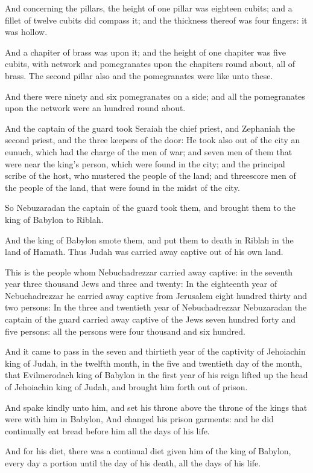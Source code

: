 \Verse And concerning the pillars, the height of one pillar was eighteen cubits; and a fillet of twelve cubits did compass it; and the thickness thereof was four fingers: it was hollow.

\Verse And a chapiter of brass was upon it; and the height of one chapiter was five cubits, with network and pomegranates upon the chapiters round about, all of brass. The second pillar also and the pomegranates were like unto these.

\Verse And there were ninety and six pomegranates on a side; and all the pomegranates upon the network were an hundred round about.

\Verse And the captain of the guard took Seraiah the chief priest, and Zephaniah the second priest, and the three keepers of the door: \Verse He took also out of the city an eunuch, which had the charge of the men of war; and seven men of them that were near the king's person, which were found in the city; and the principal scribe of the host, who mustered the people of the land; and threescore men of the people of the land, that were found in the midst of the city.

\Verse So Nebuzaradan the captain of the guard took them, and brought them to the king of Babylon to Riblah.

\Verse And the king of Babylon smote them, and put them to death in Riblah in the land of Hamath. Thus Judah was carried away captive out of his own land.

\Verse This is the people whom Nebuchadrezzar carried away captive: in the seventh year three thousand Jews and three and twenty: \Verse In the eighteenth year of Nebuchadrezzar he carried away captive from Jerusalem eight hundred thirty and two persons: \Verse In the three and twentieth year of Nebuchadrezzar Nebuzaradan the captain of the guard carried away captive of the Jews seven hundred forty and five persons: all the persons were four thousand and six hundred.

\Verse And it came to pass in the seven and thirtieth year of the captivity of Jehoiachin king of Judah, in the twelfth month, in the five and twentieth day of the month, that Evilmerodach king of Babylon in the first year of his reign lifted up the head of Jehoiachin king of Judah, and brought him forth out of prison.

\Verse And spake kindly unto him, and set his throne above the throne of the kings that were with him in Babylon, \Verse And changed his prison garments: and he did continually eat bread before him all the days of his life.

\Verse And for his diet, there was a continual diet given him of the king of Babylon, every day a portion until the day of his death, all the days of his life.

